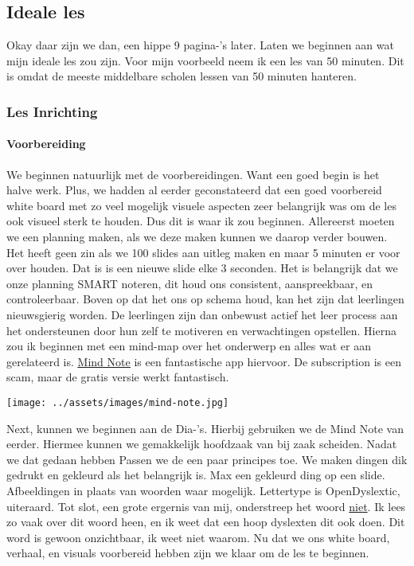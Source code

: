 \documentclass{article}
\begin{document}
        \subsection{Ideale les}
            Okay daar zijn we dan, een hippe 9 pagina-'s later. Laten we beginnen aan wat mijn ideale les zou zijn. Voor mijn voorbeeld neem ik een les van 50 minuten. Dit is omdat de meeste middelbare scholen lessen van 50 minuten hanteren. 
            \subsubsection{Les Inrichting}
                \paragraph{Voorbereiding}
                    We beginnen natuurlijk met de voorbereidingen. Want een goed begin is het halve werk. Plus, we hadden al eerder geconstateerd dat een goed voorbereid white board met zo veel mogelijk visuele aspecten zeer belangrijk was om de les ook visueel sterk te houden. Dus dit is waar ik zou beginnen. 
                    \bigskip
                    \noindent Allereerst moeten we een planning maken, als we deze maken kunnen we daarop verder bouwen. Het heeft geen zin als we 100 slides aan uitleg maken en maar 5 minuten er voor over houden. Dat is is een nieuwe slide elke 3 seconden. Het is belangrijk dat we onze planning SMART noteren, dit houd ons consistent, aanspreekbaar, en controleerbaar. Boven op dat het ons op schema houd, kan het zijn dat leerlingen nieuwsgierig worden. De leerlingen zijn dan onbewust actief het leer process aan het ondersteunen door hun zelf te motiveren en verwachtingen opstellen.\cite{NAME-ME}
                    \bigskip
                    \noindent Hierna zou ik beginnen met een mind-map over het onderwerp en alles wat er aan gerelateerd is. \hyperlink{https://www.mindnode.com}{\underline{Mind Note}} is een fantastische app hiervoor. De subscription is een scam, maar de gratis versie werkt fantastisch. 
                    \bigskip
                    \begin{center}
                        \texttt{[image: ../assets/images/mind-note.jpg]}
                    \end{center}
                    \bigskip
                    \noindent Next, kunnen we beginnen aan de Dia-'s. Hierbij gebruiken we de Mind Note van eerder. Hiermee kunnen we gemakkelijk hoofdzaak van bij zaak scheiden. Nadat we dat gedaan hebben Passen we de een paar principes toe. We maken dingen dik gedrukt en gekleurd als het belangrijk is. Max een gekleurd ding op een slide. Afbeeldingen in plaats van woorden waar mogelijk. Lettertype is OpenDyslextic, uiteraard. Tot slot, een grote ergernis van mij, onderstreep het woord \underline{niet}. Ik lees zo vaak over dit woord heen, en ik weet dat een hoop dyslexten dit ook doen. Dit word is gewoon onzichtbaar, ik weet niet waarom.
                    \bigskip
                    \noindent Nu dat we ons white board, verhaal, en visuals voorbereid hebben zijn we klaar om de les te beginnen.
\end{document}
